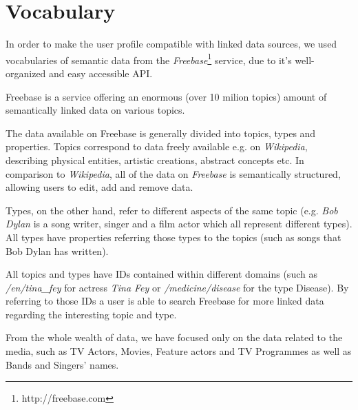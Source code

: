 \section{Vocabulary}

In order to make the user profile compatible with linked data sources, we used
vocabularies of semantic data from the \textit{Freebase}\footnote{http://freebase.com} service, due to it's
well-organized and easy accessible API.

Freebase is a service offering an enormous (over 10 milion topics) amount of semantically linked data on various topics.

The data available on Freebase is generally divided into topics, types and properties. Topics correspond to data freely
available e.g. on \textit{Wikipedia}, describing physical entities, artistic creations, abstract concepts etc. In comparison
to \textit{Wikipedia}, all of the data on \textit{Freebase} is semantically structured, allowing users to edit, add and remove data.

Types, on the other hand, refer to different aspects of the same topic (e.g. \textit{Bob Dylan} is a song writer,
singer and a film actor which all represent different types). All types have properties referring those
types to the topics (such as songs that Bob Dylan has written).

All topics and types have IDs contained within different domains (such as \textit{/en/tina\_fey} for actress \textit{Tina Fey}
or \textit{/medicine/disease} for the type Disease). By referring to those IDs a user is able to search Freebase for
more linked data regarding the interesting topic and type.

From the whole wealth of data, we have focused only on the data related to the media, such as TV Actors, Movies, Feature
actors and TV Programmes as well as Bands and Singers' names.